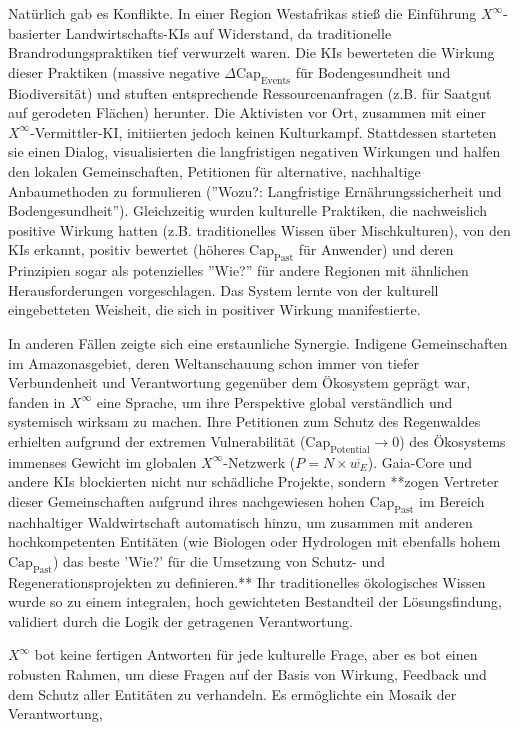 \documentclass[12pt, ngerman, parskip=full]{scrartcl} %
\begin{document}
Natürlich gab es Konflikte. In einer Region Westafrikas stieß die Einführung $X^{\infty}$-basierter Landwirtschafts-KIs auf Widerstand, da traditionelle Brandrodungspraktiken tief verwurzelt waren. Die KIs bewerteten die Wirkung dieser Praktiken (massive negative $\Delta \text{Cap}_{\text{Events}}$ für Bodengesundheit und Biodiversität) und stuften entsprechende Ressourcenanfragen (z.B. für Saatgut auf gerodeten Flächen) herunter. Die Aktivisten vor Ort, zusammen mit einer $X^{\infty}$-Vermittler-KI, initiierten jedoch keinen Kulturkampf. Stattdessen starteten sie einen Dialog, visualisierten die langfristigen negativen Wirkungen und halfen den lokalen Gemeinschaften, Petitionen für alternative, nachhaltige Anbaumethoden zu formulieren (''Wozu?: Langfristige Ernährungssicherheit und Bodengesundheit''). Gleichzeitig wurden kulturelle Praktiken, die nachweislich positive Wirkung hatten (z.B. traditionelles Wissen über Mischkulturen), von den KIs erkannt, positiv bewertet (höheres $\text{Cap}_{\text{Past}}$ für Anwender) und deren Prinzipien sogar als potenzielles ''Wie?'' für andere Regionen mit ähnlichen Herausforderungen vorgeschlagen. Das System lernte von der kulturell eingebetteten Weisheit, die sich in positiver Wirkung manifestierte.

In anderen Fällen zeigte sich eine erstaunliche Synergie. Indigene Gemeinschaften im Amazonasgebiet, deren Weltanschauung schon immer von tiefer Verbundenheit und Verantwortung gegenüber dem Ökosystem geprägt war, fanden in $X^{\infty}$ eine Sprache, um ihre Perspektive global verständlich und systemisch wirksam zu machen. Ihre Petitionen zum Schutz des Regenwaldes erhielten aufgrund der extremen Vulnerabilität ($\text{Cap}_{\text{Potential}} \rightarrow 0$) des Ökosystems immenses Gewicht im globalen $X^{\infty}$-Netzwerk ($P = N \times \overline{w_E}$). Gaia-Core und andere KIs blockierten nicht nur schädliche Projekte, sondern **zogen Vertreter dieser Gemeinschaften aufgrund ihres nachgewiesen hohen $\text{Cap}_{\text{Past}}$ im Bereich nachhaltiger Waldwirtschaft automatisch hinzu, um zusammen mit anderen hochkompetenten Entitäten (wie Biologen oder Hydrologen mit ebenfalls hohem $\text{Cap}_{\text{Past}}$) das beste 'Wie?' für die Umsetzung von Schutz- und Regenerationsprojekten zu definieren.** Ihr traditionelles ökologisches Wissen wurde so zu einem integralen, hoch gewichteten Bestandteil der Lösungsfindung, validiert durch die Logik der getragenen Verantwortung.

$X^{\infty}$ bot keine fertigen Antworten für jede kulturelle Frage, aber es bot einen robusten Rahmen, um diese Fragen auf der Basis von Wirkung, Feedback und dem Schutz aller Entitäten zu verhandeln. Es ermöglichte ein Mosaik der Verantwortung,
\end{document}
